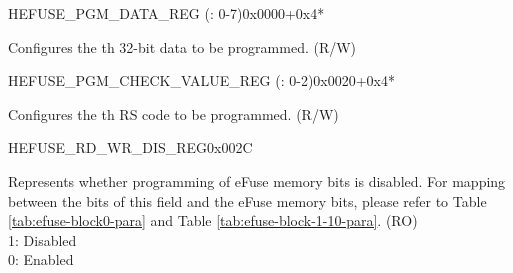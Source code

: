 \begin{register}{H}{EFUSE\_PGM\_DATA\_REG (: 0-7)}{0x0000+0x4*}\label{regdesc:EFUSEPGMDATANREG}
%
\regnewline%
\begin{regdesc}\begin{reglist}
\label{fielddesc:EFUSEPGMDATAN}\item [EFUSE\_PGM\_DATA\_\regindex{n}] Configures the th 32-bit data to be programmed. (R/W)
\end{reglist}\end{regdesc}
\end{register}


\begin{register}{H}{EFUSE\_PGM\_CHECK\_VALUE\_REG (: 0-2)}{0x0020+0x4*}\label{regdesc:EFUSEPGMCHECKVALUENREG}
%
\regnewline%
\begin{regdesc}\begin{reglist}
\label{fielddesc:EFUSEPGMRSDATAN}\item [EFUSE\_PGM\_RS\_DATA\_\regindex{n}] Configures the th RS code to be programmed. (R/W)
\end{reglist}\end{regdesc}
\end{register}


\begin{register}{H}{EFUSE\_RD\_WR\_DIS\_REG}{0x002C}\label{regdesc:EFUSERDWRDISREG}
%
\regnewline%
\begin{regdesc}\begin{reglist}
\label{fielddesc:EFUSEWRDIS}\item [EFUSE\_WR\_DIS] Represents whether programming of eFuse memory bits is disabled. For mapping between the bits of this field and the eFuse memory bits, please refer to Table \ref{tab:efuse-block0-para} and Table \ref{tab:efuse-block-1-10-para}. (RO)\\1: Disabled\\0: Enabled
\end{reglist}\end{regdesc}
\end{register}


